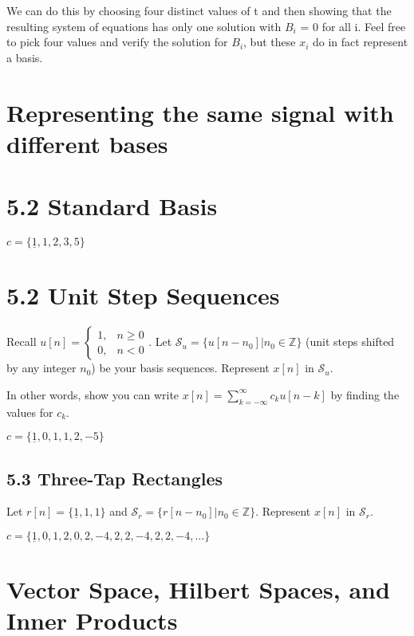 \documentclass[11pt]{article}
\begin{document}
We can do this by choosing four distinct values of t and then showing that the resulting system of equations has only one solution with $B_i$ = 0 for all i. Feel free to pick four values and verify the solution for $B_i$, but these $x_i$ do in fact represent a basis.

\section*{Representing the same signal with different bases}

\section*{5.2 \hspace{3mm} Standard Basis}
{\color{blue}
$c = \{\underline{1}, 1, 2, 3, 5\}$
}


\section*{5.2 \hspace{3mm} Unit Step Sequences}
Recall $u[n] = \begin{cases}1, & n \geq 0\\ 0, & n < 0 \end{cases}$. Let $\mathcal{S}_u = \{u[n-n_0]|n_0 \in \mathbb{Z}\}$ (unit steps shifted by any integer $n_0$) be your basis sequences. Represent $x[n]$ in $\mathcal{S}_u$.

In other words, show you can write $x[n]=\sum\limits_{k=-\infty}^\infty c_k u[n-k]$ by finding the values for $c_k$.

{\color{blue}
$c = \{\underline{1}, 0, 1, 1, 2, -5\}$
}

\subsection*{5.3 \hspace{3mm} Three-Tap Rectangles}
Let $r[n] = \{\underline{1},1,1\}$ and $\mathcal{S}_r = \{r[n-n_0]|n_0 \in \mathbb{Z}\}$. Represent $x[n]$ in $\mathcal{S}_r$.

{\color{blue}
$c = \{\underline{1}, 0, 1, 2, 0, 2, -4, 2, 2, -4, 2, 2, -4, \ldots \}$
}


\section*{Vector Space, Hilbert Spaces, and Inner Products}
\end{document}
